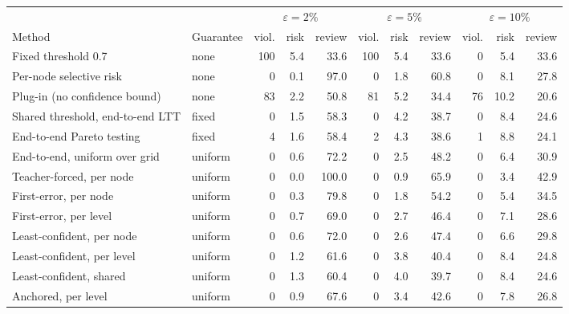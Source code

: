\begin{tabular}{llrrrrrrrrr}
\toprule
 & & \multicolumn{3}{c}{$\varepsilon=2\%$} & \multicolumn{3}{c}{$\varepsilon=5\%$} & \multicolumn{3}{c}{$\varepsilon=10\%$} \\
\cmidrule(lr){3-5}\cmidrule(lr){6-8}\cmidrule(lr){9-11}
Method & Guarantee & viol. & risk & review & viol. & risk & review & viol. & risk & review \\
\midrule
Fixed threshold 0.7 & none & 100 & 5.4 & 33.6 & 100 & 5.4 & 33.6 & 0 & 5.4 & 33.6 \\
Per-node selective risk & none & 0 & 0.1 & 97.0 & 0 & 1.8 & 60.8 & 0 & 8.1 & 27.8 \\
Plug-in (no confidence bound) & none & 83 & 2.2 & 50.8 & 81 & 5.2 & 34.4 & 76 & 10.2 & 20.6 \\
\midrule
Shared threshold, end-to-end LTT & fixed & 0 & 1.5 & 58.3 & 0 & 4.2 & 38.7 & 0 & 8.4 & 24.6 \\
End-to-end Pareto testing & fixed & 4 & 1.6 & 58.4 & 2 & 4.3 & 38.6 & 1 & 8.8 & 24.1 \\
End-to-end, uniform over grid & uniform & 0 & 0.6 & 72.2 & 0 & 2.5 & 48.2 & 0 & 6.4 & 30.9 \\
\midrule
Teacher-forced, per node & uniform & 0 & 0.0 & 100.0 & 0 & 0.9 & 65.9 & 0 & 3.4 & 42.9 \\
First-error, per node & uniform & 0 & 0.3 & 79.8 & 0 & 1.8 & 54.2 & 0 & 5.4 & 34.5 \\
First-error, per level & uniform & 0 & 0.7 & 69.0 & 0 & 2.7 & 46.4 & 0 & 7.1 & 28.6 \\
\midrule
Least-confident, per node & uniform & 0 & 0.6 & 72.0 & 0 & 2.6 & 47.4 & 0 & 6.6 & 29.8 \\
Least-confident, per level & uniform & 0 & 1.2 & 61.6 & 0 & 3.8 & 40.4 & 0 & 8.4 & 24.8 \\
Least-confident, shared & uniform & 0 & 1.3 & 60.4 & 0 & 4.0 & 39.7 & 0 & 8.4 & 24.6 \\
Anchored, per level & uniform & 0 & 0.9 & 67.6 & 0 & 3.4 & 42.6 & 0 & 7.8 & 26.8 \\
\bottomrule
\end{tabular}
